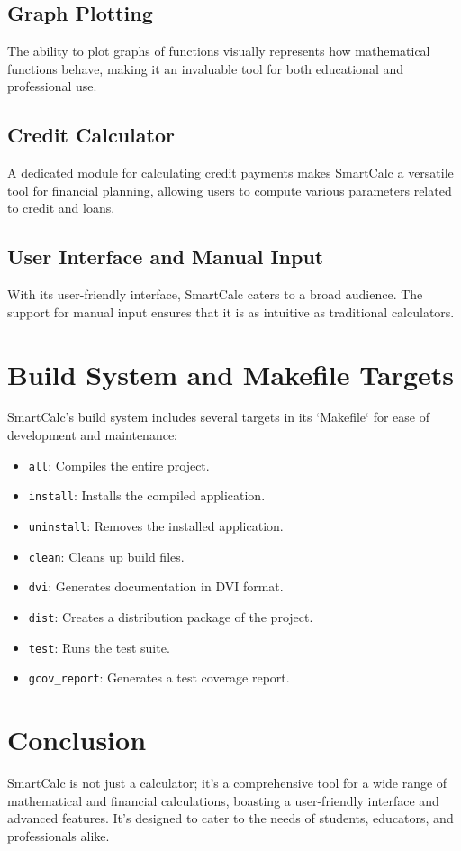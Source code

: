 \documentclass{article}
\begin{document}
\subsection{Graph Plotting}

The ability to plot graphs of functions visually represents how mathematical functions behave, making it an invaluable tool for both educational and professional use.

\subsection{Credit Calculator}

A dedicated module for calculating credit payments makes SmartCalc a versatile tool for financial planning, allowing users to compute various parameters related to credit and loans.

\subsection{User Interface and Manual Input}

With its user-friendly interface, SmartCalc caters to a broad audience. The support for manual input ensures that it is as intuitive as traditional calculators.

\section{Build System and Makefile Targets}

SmartCalc's build system includes several targets in its `Makefile` for ease of development and maintenance:

\begin{itemize}
    \item \texttt{all}: Compiles the entire project.
    \item \texttt{install}: Installs the compiled application.
    \item \texttt{uninstall}: Removes the installed application.
    \item \texttt{clean}: Cleans up build files.
    \item \texttt{dvi}: Generates documentation in DVI format.
    \item \texttt{dist}: Creates a distribution package of the project.
    \item \texttt{test}: Runs the test suite.
    \item \texttt{gcov\_report}: Generates a test coverage report.
\end{itemize}

\section{Conclusion}

SmartCalc is not just a calculator; it's a comprehensive tool for a wide range of mathematical and financial calculations, boasting a user-friendly interface and advanced features. It's designed to cater to the needs of students, educators, and professionals alike.
\end{document}
